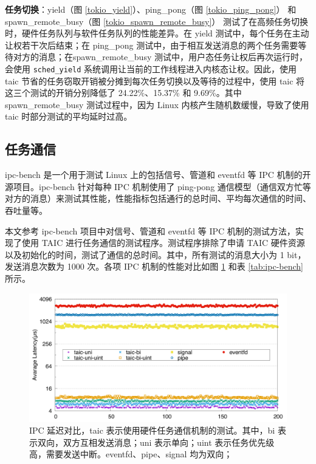 \textbf{任务切换}：yield（图 \ref{tokio_yield}）、ping\_pong（图 \ref{tokio_ping_pong}） 和 spawn\_remote\_busy（图 \ref{tokio_spawn_remote_busy}） 测试了在高频任务切换时，硬件任务队列与软件任务队列的性能差异。在 yield 测试中，每个任务在主动让权若干次后结束；在 ping\_pong 测试中，由于相互发送消息的两个任务需要等待对方的消息；在spawn\_remote\_busy 测试中，用户态任务让权后再次运行时，会使用 \verb|sched_yield| 系统调用让当前的工作线程进入内核态让权。因此，使用 taic 节省的任务窃取开销被分摊到每次任务切换以及等待的过程中，使用 taic 将这三个测试的开销分别降低了 24.22\%、15.37\% 和 9.69\%。其中 spawn\_remote\_busy 测试过程中，因为 Linux 内核产生随机数缓慢，导致了使用 taic 时部分测试的平均延时过高。

\subsection{任务通信}

ipc-bench \cite{ipc-bench_2025} 是一个用于测试 Linux 上的包括信号、管道和 eventfd 等 IPC 机制的开源项目。ipc-bench 针对每种 IPC 机制使用了 ping-pong 通信模型（通信双方忙等对方的消息）来测试其性能，性能指标包括通行的总时间、平均每次通信的时间、吞吐量等。

本文参考 ipc-bench 项目中对信号、管道和 eventfd 等 IPC 机制的测试方法，实现了使用 TAIC 进行任务通信的测试程序。测试程序排除了申请 TAIC 硬件资源以及初始化的时间，测试了通信的总时间。其中，所有测试的消息大小为 1 bit，发送消息次数为 1000 次。各项 IPC 机制的性能对比如图 \ref{figure:ipc-bench} 和表 \ref{tab:ipc-bench} 所示。

\begin{figure}
    \centering
    \includegraphics[width=\textwidth]{figures/pdfs/taic-ipc.pdf}
    \caption{IPC 延迟对比，taic 表示使用硬件任务通信机制的测试。其中，bi 表示双向，双方互相发送消息；uni 表示单向；uint 表示任务优先级高，需要发送中断。eventfd、pipe、signal 均为双向；}
    \label{figure:ipc-bench}
\end{figure}

